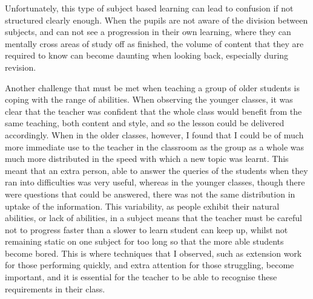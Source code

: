 		Unfortunately, this type of subject based learning can lead to confusion if not structured clearly enough. When the pupils are not aware of the division between subjects, and can not see a progression in their own learning, where they can mentally cross areas of study off as finished, the volume of content that they are required to know can become daunting when looking back, especially during revision.

		Another challenge that must be met when teaching a group of older students is coping with the range of abilities. When observing the younger classes, it was clear that the teacher was confident that the whole class would benefit from the same teaching, both content and style, and so the lesson could be delivered accordingly. When in the older classes, however, I found that I could be of much more immediate use to the teacher in the classroom as the group as a whole was much more distributed in the speed with which a new topic was learnt. This meant that an extra person, able to answer the queries of the students when they ran into difficulties was very useful, whereas in the younger classes, though there were questions that could be answered, there was not the same distribution in uptake of the information. This variability, as people exhibit their natural abilities, or lack of abilities, in a subject means that the teacher must be careful not to progress faster than a slower to learn student can keep up, whilst not remaining static on one subject for too long so that the more able students become bored. This is where techniques that I observed, such as extension work for those performing quickly, and extra attention for those struggling, become important, and it is essential for the teacher to be able to recognise these requirements in their class.

